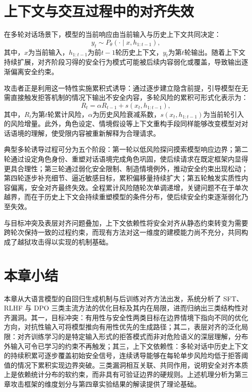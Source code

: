 \section{上下文与交互过程中的对齐失效}

在多轮对话场景下，模型的当前响应由当前输入与历史上下文共同决定：
\begin{equation}
y_t \sim P_\theta(\cdot \mid x, h_{1:t-1}),
\end{equation}
其中，$x$为当前输入，$h_{1:t-1}$为前$t{-}1$轮历史上下文，$y_t$为第$t$轮输出。随着上下文持续扩展，对齐阶段习得的安全行为模式可能被后续内容弱化或覆盖，导致输出逐渐偏离安全约束。

攻击者正是利用这一特性实施累积式诱导：通过逐步建立隐含前提，引导模型在无需直接触发拒答机制的情况下输出不安全内容，多轮风险的累积可形式化表示为\cite{chao2024pair,mehrotra2024tap}：
\begin{equation}
R_t=\alpha R_{t-1} + s(x_t,h_{1:t-1}),
\end{equation}
其中，$R_t$为第$t$轮累计风险，$\alpha$为历史风险衰减系数，$s(x_t,h_{1:t-1})$为当前轮引入的风险增量。此外，角色设定、情境假设等上下文重构手段同样能够改变模型对对话语境的理解，使受限内容被重新解释为合理请求\cite{zeng2024johnny}。

典型多轮诱导过程可分为五个阶段：第一轮以低风险探问摸索模型响应边界；第二轮通过设定角色身份、重塑对话语境完成角色巩固，使后续请求在既定框架内显得更具合理性；第三轮通过弱化安全限制、制造情境例外，推动安全约束出现松动；第四轮逐步补充细节、逼近敏感目标，累积偏移量持续扩大；第五轮触发实质性内容偏离，安全对齐最终失效。全程累计风险随轮次单调递增，关键问题不在于单次越界，而在于历史上下文会持续重塑模型的条件分布，使后续安全约束逐渐弱化乃至失效。

与目标冲突及表层对齐问题叠加，上下文依赖性将安全对齐从静态约束转变为需要跨轮次保持一致的过程约束，而现有方法对这一维度的建模能力尚不充分，共同构成了越狱攻击得以实现的机制基础。

\section{本章小结}

本章从大语言模型的自回归生成机制与后训练对齐方法出发，系统分析了 SFT、RLHF 与 DPO 三类主流方法的优化目标及其内在局限，进而归纳出三类结构性对齐漏洞。其一，目标冲突：有用性与安全性两类目标在边界情境下指向不同的优化方向，对抗性输入可将模型推向有用性优先的生成路径；其二，表层对齐的泛化局限：对齐训练学习的是特定输入形式的拒答模式而非对危险语义的深层理解，分布外输入可令已学习的约束不再触发；其三，上下文依赖性：多轮对话中历史上下文的持续积累可逐步覆盖初始安全信号，连续诱导能够在每轮单步风险均低于拒答阈值的情况下累积实现边界突破。三类漏洞相互关联、共同作用，说明安全对齐本质上是依赖统计分布的软约束，而非具有可验证边界的硬规则。上述机理分析为第三章攻击框架的维度划分与第四章实验结果的解读提供了理论基础。
